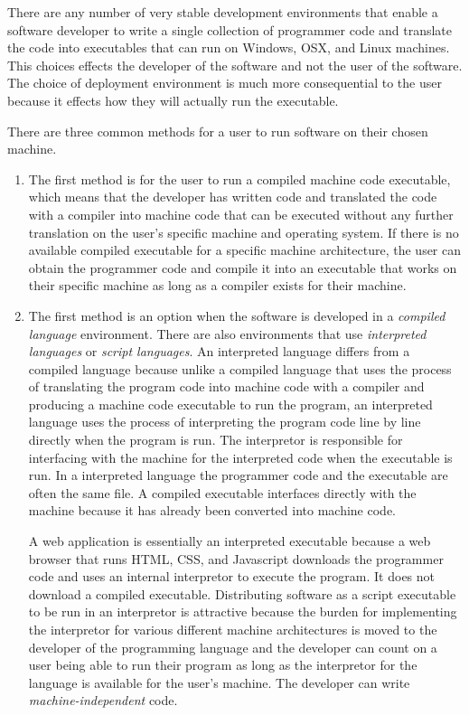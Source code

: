 There are any number of very stable development environments that enable a software developer to write a single collection of programmer code and translate the code into executables that can run on Windows, OSX, and Linux machines. This choices effects the developer of the software and not the user of the software. The choice of deployment environment is much more consequential to the user because it effects how they will actually run the executable.

There are three common methods for a user to run software on their chosen machine.

\begin{enumerate}
\item The first method is for the user to run a compiled machine code executable, which means that the developer has written code and translated the code with a compiler into machine code that can be executed without any further translation on the user's specific machine and operating system. If there is no available compiled executable for a specific machine architecture, the user can obtain the programmer code and compile it into an executable that works on their specific machine as long as a compiler exists for their machine.

\item The first method is an option when the software is developed in a \emph{compiled language} environment. There are also environments that use \emph{interpreted languages} or \emph{script languages}. An interpreted language differs from a compiled language because unlike a compiled language that uses the process of translating the program code into machine code with a compiler and producing a machine code executable to run the program, an interpreted language uses the process of interpreting the program code line by line directly when the program is run. The interpretor is responsible for interfacing with the machine for the interpreted code when the executable is run. In a interpreted language the programmer code and the executable are often the same file. A compiled executable interfaces directly with the machine because it has already been converted into machine code. 

A web application is essentially an interpreted executable because a web browser that runs HTML, CSS, and Javascript downloads the programmer code and uses an internal interpretor to execute the program. It does not download a compiled executable. Distributing software as a script executable to be run in an interpretor is attractive because the burden for implementing the interpretor for various different machine architectures is moved to the developer of the programming language and the developer can count on a user being able to run their program as long as the interpretor for the language is available for the user's machine. The developer can write \emph{machine-independent} code.


\end{enumerate}
